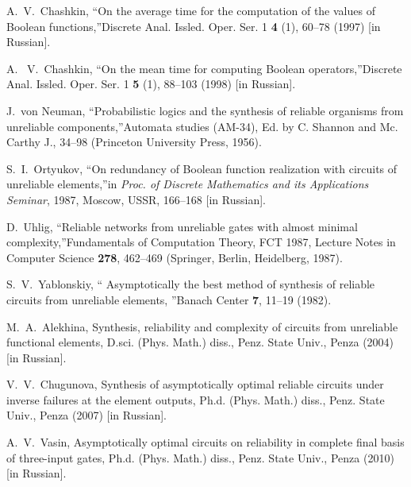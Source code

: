 \documentclass[
11pt,%
tightenlines,%
twoside,%
onecolumn,%
nofloats,%
nobibnotes,%
nofootinbib,%
superscriptaddress,%
noshowpacs,%
centertags]%
{revtex4}
\begin{document}
\begin{thebibliography}{99}

 A.~V.~Chashkin, \textquotedblleft On the average
time for the computation  of the values of Boolean
functions,\textquotedblright Discrete Anal. Issled. Oper. Ser. 1
\textbf{4} (1), 60--78 (1997) [in Russian].

 A.~ V.~Chashkin, \textquotedblleft On the mean
time for computing  Boolean operators,\textquotedblright Discrete
Anal. Issled. Oper. Ser. 1 \textbf{5} (1), 88--103 (1998) [in
Russian].

 J.~von Neuman, \textquotedblleft  Probabilistic
logics  and the synthesis of reliable organisms from unreliable
components,\textquotedblright Automata studies (AM-34), Ed. by C.
Shannon and Mc. Carthy J., 34--98 (Princeton University Press,
1956).

 S.~I.~Ortyukov, \textquotedblleft On redundancy of
Boolean function realization with circuits of unreliable
elements,\textquotedblright in \emph{Proc. of Discrete Mathematics
and its Applications Seminar}, 1987, Moscow, USSR, 166--168 [in
Russian].

 D.~Uhlig, \textquotedblleft  Reliable networks
from unreliable  gates with almost minimal
complexity,\textquotedblright Fundamentals of Computation Theory,
FCT 1987, Lecture Notes in Computer Science \textbf{278}, 462--469
(Springer, Berlin, Heidelberg, 1987).

 S.~V.~Yablonskiy, \textquotedblleft
Asymptotically the  best method of synthesis of reliable circuits
from unreliable elements, \textquotedblright Banach Center
\textbf{7}, 11--19 (1982).

 M.~A.~Alekhina, Synthesis, reliability and
complexity of  circuits from unreliable functional elements, D.sci.
(Phys. Math.) diss., Penz. State Univ., Penza (2004) [in Russian].

 V.~V.~Chugunova, Synthesis of asymptotically
optimal reliable  circuits under inverse failures at the element
outputs,  Ph.d. (Phys. Math.) diss., Penz. State Univ., Penza (2007)
[in Russian].

 A.~V.~Vasin, Asymptotically optimal circuits on
reliability  in complete final basis of  three-input gates, Ph.d.
(Phys. Math.) diss., Penz. State Univ., Penza (2010) [in Russian].


\end{thebibliography}
\end{document}
